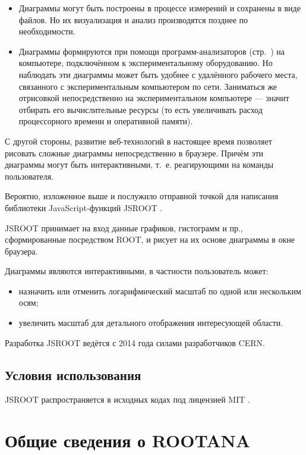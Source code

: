 \documentclass[12pt, a4paper, oneside, onecolumn]{book}
\newcommand{\ROOT}{\mbox{ROOT}}
\newcommand{\ROOTJS}{\mbox{JSROOT}}
\newcommand{\ROOTANA}{\mbox{ROOTANA}}
\begin{document}
\begin{itemize}

\item Диаграммы могут быть построены в процессе измерений и сохранены в виде файлов. Но их визуализация и анализ производятся позднее по необходимости.

\item Диаграммы формируются при помощи программ-анализаторов (стр.~\pageref{sec-midas-analyzer}) на компьютере, подключённом к экспериментальному оборудованию. Но наблюдать эти диаграммы может быть удобнее с удалённого рабочего места, связанного с экспериментальным компьютером по сети. Заниматься же отрисовкой непосредственно на экспериментальном компьютере --- значит отбирать его вычислительные ресурсы (то есть увеличивать расход процессорного времени и оперативной памяти).

\end{itemize}

С другой стороны, развитие веб-технологий в настоящее время позволяет рисовать сложные диаграммы непосредственно в браузере. Причём эти диаграммы могут быть интерактивными, т.~е. реагирующими на команды пользователя.

Вероятно, изложенное выше и послужило отправной точкой для написания библиотеки JavaScript-функций \ROOTJS{} \cite{JsRootHome}.

\ROOTJS{} принимает на вход данные графиков, гистограмм и пр., сформированные посредством \ROOT{}, и рисует на их основе диаграммы в окне браузера. 

Диаграммы являются интерактивными, в частности пользователь может:

\begin{itemize}
\item назначить или отменить логарифмический масштаб по одной или нескольким осям;
\item увеличить масштаб для детального отображения интересующей области.
\end{itemize}

Разработка \ROOTJS{} ведётся с 2014 года силами разработчиков CERN.

\subsection{Условия использования}

\ROOTJS{} распространяется в исходных кодах под лицензией MIT \cite{JsRootHome}.

\section{Общие сведения о \ROOTANA{}}
\label{sec-rootana}
\end{document}
